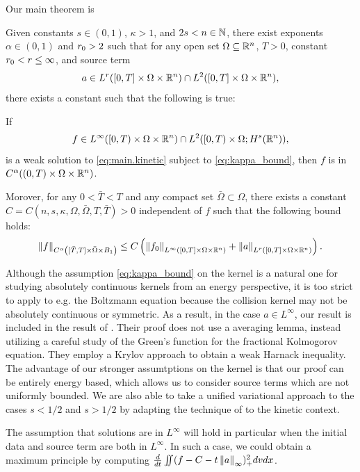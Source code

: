 Our main theorem is 
\begin{theorem} \label{thm:main}
Given constants $s \in (0,1)$, $\kappa > 1$, and $2s < n \in \mathbb{N}$, there exist exponents $\alpha \in (0,1)$ and ${r}_0 > 2$ such that for any open set $\Omega \subseteq \mathbb{R}^n$, $T > 0$, constant ${r}_0 < r \leq \infty$, and source term
\[ a \in L^{r}([0,T] \times \Omega \times \mathbb{R}^n) \cap L^2([0,T] \times \Omega \times \mathbb{R}^n), \]
there exists a constant such that the following is true:

If 
\[ f \in L^\infty([0,T)\times\Omega \times\mathbb{R}^n) \cap L^2([0,T)\times \Omega; H^s(\mathbb{R}^n)), \]
is a weak solution to \eqref{eq:main.kinetic} subject to \eqref{eq:kappa_bound}, then $f$ is in $C^\alpha((0,T)\times\Omega\times\mathbb{R}^n)$.  

\begin{sloppypar}
Morover, for any $0 < \bar{T} < T$ and any compact set $\bar{\Omega} \subset \Omega$, there exists a constant $C = C(n,s,\kappa,\Omega,\bar{\Omega},T,\bar{T}) > 0$ independent of $f$ such that the following bound holds:
\[ \left\lVert f\right\rVert_{C^\alpha\left( [\bar{T},T]\times\bar{\Omega}\times B_1 \right)} \leq C \left( \left\lVert f_0\right\rVert_{L^\infty\left( [0,T]\times\Omega\times \mathbb{R}^n \right)} + \left\lVert a\right\rVert_{L^{r}\left( [0,T]\times\Omega\times \mathbb{R}^n \right)} \right).  \]
\end{sloppypar}
\end{theorem}

Although the assumption \eqref{eq:kappa_bound} on the kernel is a natural one for studying absolutely continuous kernels from an energy perspective, it is too strict to apply to e.g. the Boltzmann equation because the collision kernel may not be absolutely continuous or symmetric.   As a result, in the case $a \in L^\infty$, our result is included in the result of \cite{ImSi}.  Their proof does not use a averaging lemma, instead utilizing a careful study of the Green's function for the fractional Kolmogorov equation.  They employ a Krylov approach to obtain a weak Harnack inequality. The advantage of our stronger assumtptions on the kernel is that our proof can be entirely energy based, which allows us to consider source terms which are not uniformly bounded.  We are also able to take a unified variational approach to the cases $s < 1/2$ and $s > 1/2$ by adapting the technique of \cite{CaChVa} to the kinetic context.  

The assumption that solutions are in $L^\infty$ will hold in particular when the initial data and source term are both in $L^\infty$.  In such a case, we could obtain a maximum principle by computing $\frac{d}{dt} \iint (f-C-t\left\lVert a\right\rVert_\infty)_+^2 dvdx$.  

